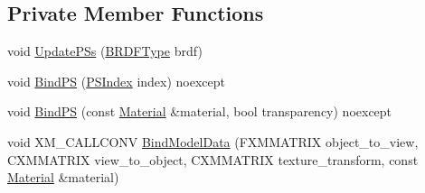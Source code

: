 \subsection*{Private Member Functions}
\begin{DoxyCompactItemize}
\item 
void \hyperlink{classmage_1_1_variable_shading_pass_a4e0a0e7709d99bb94f3263bdf478f484}{Update\+P\+Ss} (\hyperlink{namespacemage_af1044f87544bc38427766a8c795d2f26}{B\+R\+D\+F\+Type} brdf)
\item 
void \hyperlink{classmage_1_1_variable_shading_pass_a9352c4b8b435254768c3407550458fb5}{Bind\+PS} (\hyperlink{classmage_1_1_variable_shading_pass_a99a5986785950a884405617f8d05cae5}{P\+S\+Index} index) noexcept
\item 
void \hyperlink{classmage_1_1_variable_shading_pass_af4c6c4ecef26d642054e6c7d8dac0a32}{Bind\+PS} (const \hyperlink{classmage_1_1_material}{Material} \&material, bool transparency) noexcept
\item 
void X\+M\+\_\+\+C\+A\+L\+L\+C\+O\+NV \hyperlink{classmage_1_1_variable_shading_pass_a397b49713231c0f9af6b5a4f9bafa394}{Bind\+Model\+Data} (F\+X\+M\+M\+A\+T\+R\+IX object\+\_\+to\+\_\+view, C\+X\+M\+M\+A\+T\+R\+IX view\+\_\+to\+\_\+object, C\+X\+M\+M\+A\+T\+R\+IX texture\+\_\+transform, const \hyperlink{classmage_1_1_material}{Material} \&material)
\end{DoxyCompactItemize}
